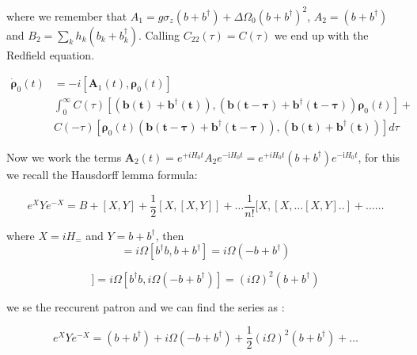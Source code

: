\documentclass[%
preprint,
onecolumn,
notitlepag,
 amsmath,amssymb,
 aps,
 pra,
]{revtex4-2}
\begin{document}
\begin{itemize}
where we remember that $A_1= g \sigma_z  \left( b + b ^{\dagger} \right) +  \Delta \Omega_0 \left( b + b ^{\dagger} \right)^2 $, $A_2= \left( b + b ^{\dagger} \right) $ and $B_2= \sum_k h_k \left( b_k + b_k ^{\dagger} \right)$. Calling $C_{22}(\tau)=C(\tau)$ we end up with the Redfield equation. 


\begin{equation}\begin{align}
\dot{\boldsymbol{\rho}}_0(t) &= -i \left[ \boldsymbol{A}_1(t) , \boldsymbol{\rho}_0(t) \right] \\
&\int_{0}^{\infty} C(\tau)\left[\boldsymbol{\left( b(t) + b ^{\dagger}(t) \right)}, \left( \boldsymbol{ b(t-\tau) + b ^{\dagger} (t-\tau) }\right) \boldsymbol{\rho}_{\mathrm{0}}(t)\right]+ \\
&C(-\tau)\left[\boldsymbol{\rho}_{\mathrm{0}}(t) \left( \boldsymbol{ b(t-\tau) + b ^{\dagger} (t-\tau) } \right), \boldsymbol{\left( b(t) + b ^{\dagger}(t) \right)}\right] d \tau 
\end{align}
\end{equation}



Now we work the terms $\boldsymbol{A}_2(t) = e^{+i H_{0} t} A_2 e^{-\mathrm{i} H_{0} t} = e^{+i H_{0} t} (b+b^{\dagger}) e^{-\mathrm{i} H_{0} t} $, for this we recall the Hausdorff lemma formula:


\begin{equation}
\left.e^{X} Y e^{-X}=B+[X, Y]+\frac{1}{2}[X,[X, Y]]+\ldots \frac{1}{n !}[X,[X, \ldots[X, Y] . .]+\ldots \ldots
\end{equation}

where $X= i H_=$ and $Y= b+b^{\dagger} $, then 
\begin{equation}
[X, Y] = i \Omega [ b^{\dagger}b , b+b^{\dagger}  ] = i \Omega  \left( -b+b^{\dagger}  \right)  
\end{equation}

\begin{equation}
[X,[X, Y]]= i \Omega [ b^{\dagger}b , i \Omega  \left( -b+b^{\dagger}  \right)  ] = (i \Omega) ^2   \left( b+b^{\dagger}  \right) 
\end{equation}

we se the reccurent patron and we can find the series as :

\begin{equation}
\left.e^{X} Y e^{-X}= \left(b+b^{\dagger} \right) +i \Omega  \left( -b+b^{\dagger}  \right)  +\frac{1}{2}(i \Omega) ^2   \left( b+b^{\dagger}  \right) +\ldots 
\end{equation}


\end{itemize}
\end{document}
